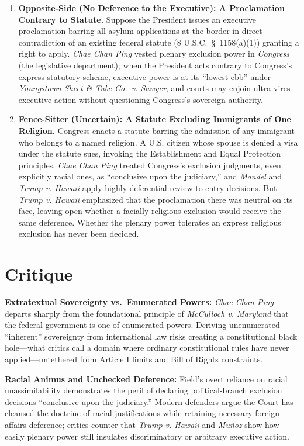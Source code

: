 \documentclass[12pt]{article}
\begin{document}
\begin{enumerate}
\item \textbf{Opposite-Side (No Deference to the Executive): A Proclamation Contrary to Statute.} Suppose the President issues an executive proclamation barring all asylum applications at the border in direct contradiction of an existing federal statute (8 U.S.C.\ \S\ 1158(a)(1)) granting a right to apply. \textit{Chae Chan Ping} vested plenary exclusion power in \textit{Congress} (the legislative department); when the President acts contrary to Congress's express statutory scheme, executive power is at its ``lowest ebb'' under \textit{Youngstown Sheet \& Tube Co.\ v. Sawyer}, and courts may enjoin ultra vires executive action without questioning Congress's sovereign authority.

\item \textbf{Fence-Sitter (Uncertain): A Statute Excluding Immigrants of One Religion.} Congress enacts a statute barring the admission of any immigrant who belongs to a named religion. A U.S. citizen whose spouse is denied a visa under the statute sues, invoking the Establishment and Equal Protection principles. \textit{Chae Chan Ping} treated Congress's exclusion judgments, even explicitly racial ones, as ``conclusive upon the judiciary,'' and \textit{Mandel} and \textit{Trump v. Hawaii} apply highly deferential review to entry decisions. But \textit{Trump v. Hawaii} emphasized that the proclamation there was neutral on its face, leaving open whether a facially religious exclusion would receive the same deference. Whether the plenary power tolerates an express religious exclusion has never been decided.

\end{enumerate}

\section{Critique}
\textbf{Extratextual Sovereignty vs.\ Enumerated Powers:} \textit{Chae Chan Ping} departs sharply from the foundational principle of \textit{McCulloch v. Maryland} that the federal government is one of enumerated powers. Deriving unenumerated ``inherent'' sovereignty from international law risks creating a constitutional black hole---what critics call a domain where ordinary constitutional rules have never applied---untethered from Article I limits and Bill of Rights constraints.

\textbf{Racial Animus and Unchecked Deference:} Field's overt reliance on racial unassimilability demonstrates the peril of declaring political-branch exclusion decisions ``conclusive upon the judiciary.'' Modern defenders argue the Court has cleansed the doctrine of racial justifications while retaining necessary foreign-affairs deference; critics counter that \textit{Trump v. Hawaii} and \textit{Mu\~{n}oz} show how easily plenary power still insulates discriminatory or arbitrary executive action.
\end{document}
